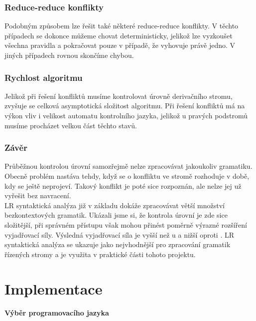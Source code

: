\subsection{Reduce-reduce konflikty}
\label{subsec:reduceReduce}

Podobným způsobem lze řešit také některé reduce-reduce konflikty.
V těchto případech se dokonce můžeme chovat deterministicky,
jelikož lze vyzkoušet všechna pravidla a pokračovat pouze v případě,
že vyhovuje právě jedno. V jiných případech rovnou skončíme chybou.

\subsection{Rychlost algoritmu}
\label{subsec:speed}

Jelikož při řešení konfliktů musíme kontrolovat úrovně derivačního stromu,
zvyšuje se celková asymptotická složitost algoritmu. Při řešení konfliktů
má na výkon vliv i velikost automatu kontrolního jazyka, jelikož u pravých
podstromů musíme procházet velkou část těchto stavů.

\subsection*{Závěr}

Průběžnou kontrolou úrovní samozřejmě nelze zpracovávat jakoukoliv gramatiku.
Obecně problém nastáva tehdy, když se o konfliktu ve stromě rozhoduje
v době, kdy se ještě neprojeví. Takový konflikt je poté sice rozpoznán,
ale nelze jej už vyřešit bez navracení.\\

LR syntaktická analýza již v základu dokáže zpracovávat větší množství
bezkontextových gramatik. Ukázali jsme si, že kontrola úrovní je zde
sice složitější, při správném přístupu však mohou přinést poměrně výrazné
rozšíření vyjadřovací síly. Výsledná vyjadřovací síla je vyšší než u
 a nižší oproti .
LR syntaktická analýza se ukazuje jako nejvhodnější pro zpracování
gramatik řízených stromy a je využita v praktické části tohoto projektu.\\

\chapter{Implementace}
\label{chap:Implementation}

\subsubsection*{Výběr programovacího jazyka}

